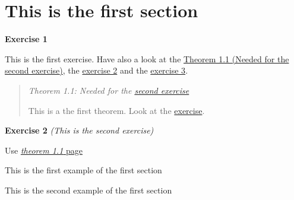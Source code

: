 \ifdef{\mainmatter}{}{\listofexample
\listofexercise
\listoftheorem}

\hypertarget{this-is-the-first-section}{%
\section{This is the first section}\label{this-is-the-first-section}}

\protect\hypertarget{exercise:1}{}{}\protect\hypertarget{exercise:1}{}{\label{exercise:1}\label{exercise:1}\textbf{Exercise
1}}

This is the first exercise. Have also a look at the
\protect\hyperlink{theorem:first}{{Theorem 1.1 (Needed for the
\protect\hyperlink{exercise:second}{second exercise})}}, the
\protect\hyperlink{exercise:second}{{exercise 2}} and the
\protect\hyperlink{exercise:last}{{exercise 3}}.

\begin{quote}
\protect\hypertarget{theorem:this-is-the-first-section.needed-for-the-second-exercise}{}{}\protect\hypertarget{theorem:first}{}{\label{theorem:first}\label{theorem:this-is-the-first-section.needed-for-the-second-exercise}\emph{Theorem
1.1: Needed for the \protect\hyperlink{exercise:second}{second
exercise}}}

This is a the first theorem. Look at the
\protect\hyperlink{exercise:second}{exercise}.
\end{quote}

\protect\hypertarget{exercise:this-is-the-second-exercise}{}{}\protect\hypertarget{exercise:second}{}{\label{exercise:second}\label{exercise:this-is-the-second-exercise}\textbf{Exercise
2} \emph{(This is the second exercise)}}

Use \protect\hyperlink{theorem:first}{\emph{theorem 1.1} page
\pageref{theorem:first}}

\begin{description}
\tightlist
\item[\phantomsection\addcontentsline{example}{example}{\protect\numberline {1.1}{\ignorespaces {Example}}}\protect\hypertarget{example:this-is-the-first-section.1}{}{}\protect\hypertarget{example:1.1}{}{\label{example:1.1}\label{example:this-is-the-first-section.1}\textbf{Example
1}}]
This is the first example of the first section
\item[\phantomsection\addcontentsline{example}{example}{\protect\numberline {1.2}{\ignorespaces {Example}}}\protect\hypertarget{example:this-is-the-first-section.2}{}{}\protect\hypertarget{example:1.2}{}{\label{example:1.2}\label{example:this-is-the-first-section.2}\textbf{Example
2}}]
This is the second example of the first section
\end{description}

